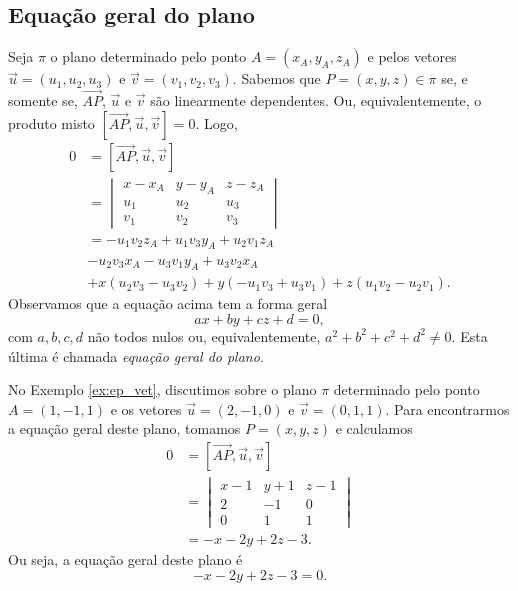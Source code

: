 \subsection{Equação geral do plano}

Seja $\pi$ o plano determinado pelo ponto $A=(x_A,y_A,z_A)$ e pelos vetores $\vec{u}=(u_1,u_2,u_3)$ e $\vec{v} = (v_1,v_2,v_3)$. Sabemos que $P=(x,y,z)\in\pi$ se, e somente se, $\overrightarrow{AP}$, $\vec{u}$ e $\vec{v}$ são linearmente dependentes. Ou, equivalentemente, o produto misto $[\overrightarrow{AP},\vec{u},\vec{v}] = 0$. Logo,
\begin{align}
  0 &= [\overrightarrow{AP},\vec{u},\vec{v}] \\
    &=
      \begin{vmatrix}
        x-x_A & y-y_A & z-z_A \\
        u_1 & u_2 & u_3 \\
        v_1 & v_2 & v_3
      \end{vmatrix} \\
    &= -u_1v_2z_A + u_1v_3y_A + u_2v_1z_A \\
    &- u_2v_3x_A - u_3v_1y_A + u_3v_2x_A \\
    &+ x(u_2v_3 - u_3v_2) + y(-u_1v_3 + u_3v_1) + z(u_1v_2 - u_2v_1).
\end{align}
Observamos que a equação acima tem a forma geral
\begin{equation}
  ax + by + cz + d = 0,
\end{equation}
com $a,b,c,d$ não todos nulos ou, equivalentemente, $a^2+b^2+c^2+d^2\neq 0$. Esta última é chamada \emph{equação geral do plano}.

\begin{ex}
  No Exemplo \ref{ex:ep_vet}, discutimos sobre o plano $\pi$ determinado pelo ponto $A = (1,-1,1)$ e os vetores $\vec{u}=(2,-1,0)$ e $\vec{v}=(0,1,1)$. Para encontrarmos a equação geral deste plano, tomamos $P = (x,y,z)$ e calculamos
  \begin{align}
    0 &= [\overrightarrow{AP},\vec{u},\vec{v}]\\
      &=
        \begin{vmatrix}
          x-1 & y+1 & z-1 \\
          2 & -1 & 0 \\
          0 & 1 & 1
        \end{vmatrix}\\
      &= - x - 2 y + 2 z - 3.
  \end{align}
  Ou seja, a equação geral deste plano é
  \begin{equation}
    -x - 2y + 2z -3 = 0.
  \end{equation}
\end{ex}

